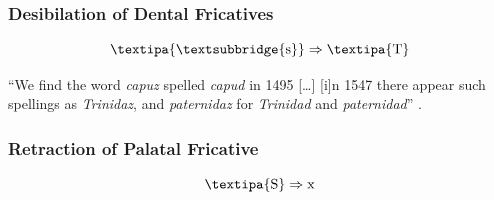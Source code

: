 \documentclass{report}[12pt]
\begin{document}
\subsubsection{Desibilation of Dental Fricatives}\label{sec:desibil_dental_fric}

\begin{tcolorbox}
  \[ \text{\textipa{\textsubbridge{s}}} \Rightarrow \text{\textipa{T}} \]
\end{tcolorbox}

``We find the word \emph{capuz} spelled \emph{capud} in 1495 [\dots] [i]n 1547 there appear such spellings as \emph{Trinidaz}, and \emph{paternidaz} for \emph{Trinidad} and \emph{paternidad}'' \parencite[p.~334]{lloyd_spanish}.

\subsubsection{Retraction of Palatal Fricative}

\begin{tcolorbox}
  \[ \text{\textipa{S}} \Rightarrow \text{x} \]
\end{tcolorbox}
\end{document}

